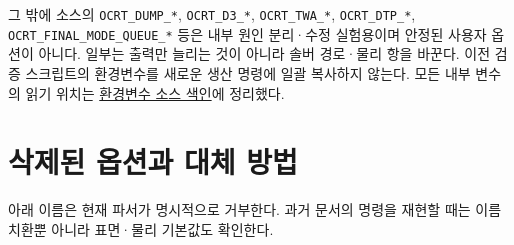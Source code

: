 그 밖에 소스의 \texttt{OCRT\_\allowbreak{}DUMP\_\allowbreak{}*}, \texttt{OCRT\_\allowbreak{}D3\_\allowbreak{}*}, \texttt{OCRT\_\allowbreak{}TWA\_\allowbreak{}*}, \texttt{OCRT\_\allowbreak{}DTP\_\allowbreak{}*}, \texttt{OCRT\_\allowbreak{}FINAL\_\allowbreak{}MODE\_\allowbreak{}QUEUE\_\allowbreak{}*} 등은 내부 원인 분리·수정 실험용이며 안정된 사용자 옵션이 아니다. 일부는 출력만 늘리는 것이 아니라 솔버 경로·물리 항을 바꾼다. 이전 검증 스크립트의 환경변수를 새로운 생산 명령에 일괄 복사하지 않는다. 모든 내부 변수의 읽기 위치는 \hyperref[chap:03_environment_index]{환경변수 소스 색인}에 정리했다.

\section{삭제된 옵션과 대체 방법}
\label{sec:auto:03_options:11}
아래 이름은 현재 파서가 명시적으로 거부한다. 과거 문서의 명령을 재현할 때는 이름 치환뿐 아니라 표면·물리 기본값도 확인한다.


